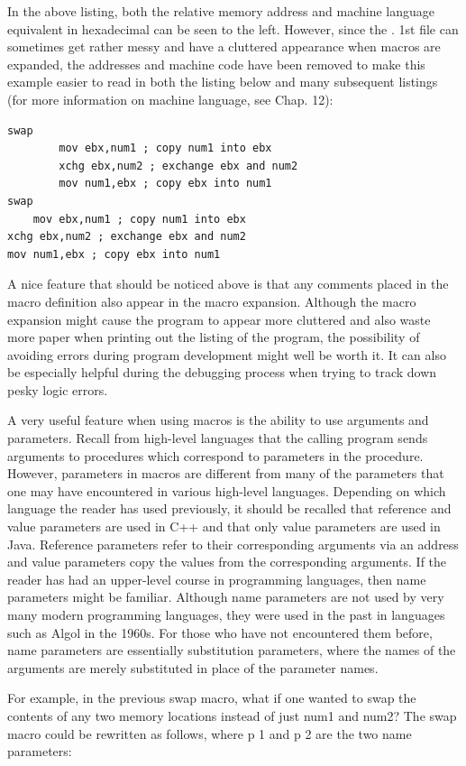 \documentclass[10pt]{article}
\begin{document}
In the above listing, both the relative memory address and machine language equivalent in hexadecimal can be seen to the left. However, since the . 1st file can sometimes get rather messy and have a cluttered appearance when macros are expanded, the addresses and machine code have been removed to make this example easier to read in both the listing below and many subsequent listings (for more information on machine language, see Chap. 12):

\begin{verbatim}
swap
        mov ebx,num1 ; copy num1 into ebx
        xchg ebx,num2 ; exchange ebx and num2
        mov num1,ebx ; copy ebx into num1
swap
    mov ebx,num1 ; copy num1 into ebx
xchg ebx,num2 ; exchange ebx and num2
mov num1,ebx ; copy ebx into num1
\end{verbatim}

A nice feature that should be noticed above is that any comments placed in the macro definition also appear in the macro expansion. Although the macro expansion might cause the program to appear more cluttered and also waste more paper when printing out the listing of the program, the possibility of avoiding errors during program development might well be worth it. It can also be especially helpful during the debugging process when trying to track down pesky logic errors.

A very useful feature when using macros is the ability to use arguments and parameters. Recall from high-level languages that the calling program sends arguments to procedures which correspond to parameters in the procedure. However, parameters in macros are different from many of the parameters that one may have encountered in various high-level languages. Depending on which language the reader has used previously, it should be recalled that reference and value parameters are used in C++ and that only value parameters are used in Java. Reference parameters refer to their corresponding arguments via an address and value parameters copy the values from the corresponding arguments. If the reader has had an upper-level course in programming languages, then name parameters might be familiar. Although name parameters are not used by very many modern programming languages, they were used in the past in languages such as Algol in the 1960s. For those who have not encountered them before, name parameters are essentially substitution parameters, where the names of the arguments are merely substituted in place of the parameter names.

For example, in the previous swap macro, what if one wanted to swap the contents of any two memory locations instead of just num1 and num2? The swap macro could be rewritten as follows, where p 1 and p 2 are the two name parameters:
\end{document}
